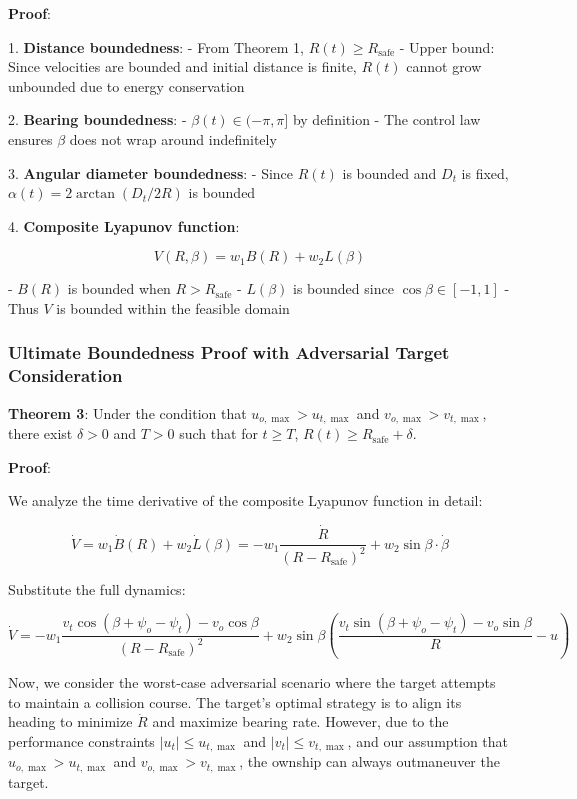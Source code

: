 \documentclass[11pt,a4paper]{article}
\numberwithin{equation}{section}
\begin{document}
\textbf{Proof}:

1. \textbf{Distance boundedness}:
   - From Theorem 1, $R(t) \geq R_{\text{safe}}$
   - Upper bound: Since velocities are bounded and initial distance is finite, $R(t)$ cannot grow unbounded due to energy conservation

2. \textbf{Bearing boundedness}:
   - $\beta(t) \in (-\pi, \pi]$ by definition
   - The control law ensures $\beta$ does not wrap around indefinitely

3. \textbf{Angular diameter boundedness}:
   - Since $R(t)$ is bounded and $D_t$ is fixed, $\alpha(t) = 2\arctan(D_t/2R)$ is bounded

4. \textbf{Composite Lyapunov function}:

\[
V(R, \beta) = w_1 B(R) + w_2 L(\beta)
\]

   - $B(R)$ is bounded when $R > R_{\text{safe}}$
   - $L(\beta)$ is bounded since $\cos\beta \in [-1, 1]$
   - Thus $V$ is bounded within the feasible domain

\subsubsection{Ultimate Boundedness Proof with Adversarial Target Consideration}

\textbf{Theorem 3}: Under the condition that $u_{o,\max} > u_{t,\max}$ and $v_{o,\max} > v_{t,\max}$, there exist $\delta > 0$ and $T > 0$ such that for $t \geq T$, $R(t) \geq R_{\text{safe}} + \delta$.

\textbf{Proof}:

We analyze the time derivative of the composite Lyapunov function in detail:

\[
\dot{V} = w_1 \dot{B}(R) + w_2 \dot{L}(\beta) = -w_1 \frac{\dot{R}}{(R-R_{\text{safe}})^2} + w_2 \sin\beta \cdot \dot{\beta}
\]

Substitute the full dynamics:

\[
\dot{V} = -w_1 \frac{v_t\cos(\beta + \psi_o - \psi_t) - v_o\cos\beta}{(R-R_{\text{safe}})^2} + w_2 \sin\beta \left( \frac{v_t\sin(\beta + \psi_o - \psi_t) - v_o\sin\beta}{R} - u \right)
\]

Now, we consider the worst-case adversarial scenario where the target attempts to maintain a collision course. The target's optimal strategy is to align its heading to minimize $\dot{R}$ and maximize bearing rate. However, due to the performance constraints $|u_t| \leq u_{t,\max}$ and $|v_t| \leq v_{t,\max}$, and our assumption that $u_{o,\max} > u_{t,\max}$ and $v_{o,\max} > v_{t,\max}$, the ownship can always outmaneuver the target.
\end{document}
